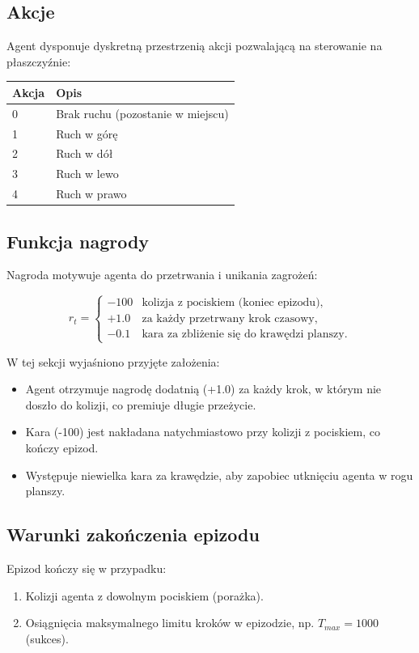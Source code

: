 \documentclass[12pt]{article}
\begin{document}
\subsection{Akcje}
Agent dysponuje dyskretną przestrzenią akcji pozwalającą na sterowanie na płaszczyźnie:

\begin{center}
\begin{tabular}{p{}p{}}
\toprule
Akcja & Opis \\
\midrule
0 & Brak ruchu (pozostanie w miejscu) \\
1 & Ruch w górę \\
2 & Ruch w dół \\
3 & Ruch w lewo \\
4 & Ruch w prawo \\
\bottomrule
\end{tabular}
\end{center}

\subsection{Funkcja nagrody}
Nagroda motywuje agenta do przetrwania i unikania zagrożeń:

\begin{equation}
    r_t = 
\begin{cases} 
-100 & \text{kolizja z pociskiem (koniec epizodu)}, \\
+1.0 & \text{za każdy przetrwany krok czasowy}, \\
-0.1 & \text{kara za zbliżenie się do krawędzi planszy}.
\end{cases}
\end{equation}

W tej sekcji wyjaśniono przyjęte założenia:
\begin{itemize}
    \item Agent otrzymuje nagrodę dodatnią (+1.0) za każdy krok, w którym nie doszło do kolizji, co premiuje długie przeżycie.
    \item Kara (-100) jest nakładana natychmiastowo przy kolizji z pociskiem, co kończy epizod.
    \item Występuje niewielka kara za krawędzie, aby zapobiec utknięciu agenta w rogu planszy.
\end{itemize}

\subsection{Warunki zakończenia epizodu}
Epizod kończy się w przypadku:
\begin{enumerate}
    \item Kolizji agenta z dowolnym pociskiem (porażka).
    \item Osiągnięcia maksymalnego limitu kroków w epizodzie, np. $T_{max} = 1000$ (sukces).
\end{enumerate}
\end{document}

